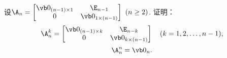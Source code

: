\begin{example}
设\(\A_n = \begin{bmatrix}
	\vb0_{(n-1)\times1} & \E_{n-1} \\
	0 & \vb0_{1\times(n-1)}
\end{bmatrix}\ (n\geq2)\).
证明：\[
	\A_n^k = \begin{bmatrix}
		\vb0_{(n-1)\times k} & \E_{n-k} \\
		0 & \vb0_{k\times(n-1)}
	\end{bmatrix}
	\quad(k=1,2,\dotsc,n-1),
\]\[
	\A_n^n = \vb0_n.
\]
\end{example}
